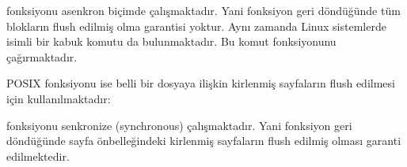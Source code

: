 \documentclass[a4paper,10pt,turkish]{sphinxmanual}
\begin{document}
\sphinxAtStartPar
{} fonksiyonu asenkron biçimde çalışmaktadır. Yani fonksiyon geri döndüğünde tüm blokların
flush edilmiş olma garantisi yoktur. Aynı zamanda Linux sistemlerde  isimli bir kabuk komutu
da bulunmaktadır. Bu komut  fonksiyonunu çağırmaktadır.

\sphinxAtStartPar
{} POSIX fonksiyonu ise belli bir dosyaya ilişkin kirlenmiş sayfaların flush edilmesi için
kullanılmaktadır:

\begin{sphinxVerbatim}[commandchars=\\\{\}]

\end{sphinxVerbatim}

\sphinxAtStartPar
{} fonksiyonu senkronize (synchronous) çalışmaktadır. Yani fonksiyon geri döndüğünde sayfa
önbelleğindeki kirlenmiş sayfaların flush edilmiş olması garanti edilmektedir.
\end{document}
